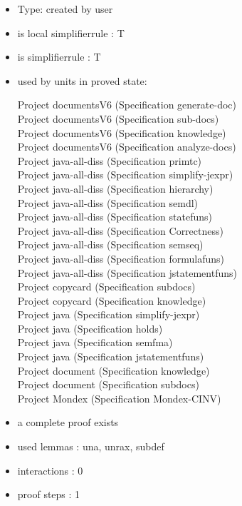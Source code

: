 \documentclass[a4paper]{article}
\begin{document}
\begin{itemize}

\item Type: created by user

\item is local simplifierrule : T
\item is simplifierrule : T
\item used by units in proved state:

Project documentsV6 (Specification generate-doc) \\
Project documentsV6 (Specification sub-docs) \\
Project documentsV6 (Specification knowledge) \\
Project documentsV6 (Specification analyze-docs) \\
Project java-all-diss (Specification primtc) \\
Project java-all-diss (Specification simplify-jexpr) \\
Project java-all-diss (Specification hierarchy) \\
Project java-all-diss (Specification semdl) \\
Project java-all-diss (Specification statefuns) \\
Project java-all-diss (Specification Correctness) \\
Project java-all-diss (Specification semseq) \\
Project java-all-diss (Specification formulafuns) \\
Project java-all-diss (Specification jstatementfuns) \\
Project copycard (Specification subdocs) \\
Project copycard (Specification knowledge) \\
Project java (Specification simplify-jexpr) \\
Project java (Specification holds) \\
Project java (Specification semfma) \\
Project java (Specification jstatementfuns) \\
Project document (Specification knowledge) \\
Project document (Specification subdocs) \\
Project Mondex (Specification Mondex-CINV)
\item       a complete proof exists
\item       used lemmas  : una, unrax, subdef
\item       interactions : 0
\item       proof steps  : 1
\end{itemize}
\end{document}
